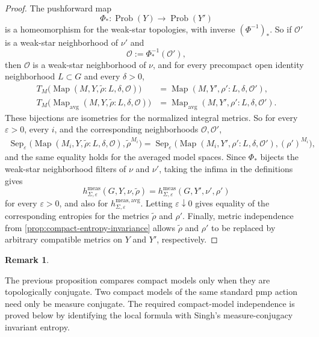 \documentclass[12pt]{amsart}
\theoremstyle{definition}
\newtheorem{remark}[remark]{Remark}
\newcommand{\Map}{\operatorname{Map}}
\newcommand{\Mapavg}{\operatorname{Map}_{\mathrm{avg}}}
\newcommand{\Sep}{\operatorname{Sep}}
\newcommand{\cO}{\mathcal O}
\newcommand{\1}{\mathbf 1}
\newcommand{\eps}{\varepsilon}
\begin{document}
\begin{proof}
	The pushforward map
	\[
	\Phi_*:\operatorname{Prob}(Y)\longrightarrow\operatorname{Prob}(Y')
	\]
	is a homeomorphism for the weak-star topologies, with inverse $(\Phi^{-1})_*$. So if $\cO'$ is a weak-star neighborhood of $\nu'$ and
	\[
	\cO:=\Phi_*^{-1}(\cO'),
	\]
	then $\cO$ is a weak-star neighborhood of $\nu$, and for every precompact open identity neighborhood $L\subset G$ and every $\delta>0$,
	\begin{align*}
		T_M\bigl(\Map(M,Y,\widetilde\rho:L,\delta,\cO)\bigr)
		&=\Map(M,Y',\rho':L,\delta,\cO'),\\
		T_M\bigl(\Mapavg(M,Y,\widetilde\rho:L,\delta,\cO)\bigr)
		&=\Mapavg(M,Y',\rho':L,\delta,\cO').
	\end{align*}
	These bijections are isometries for the normalized integral metrics. So for every $\eps>0$, every $i$, and the corresponding neighborhoods $\cO,\cO'$,
	\begin{align*}
		\Sep_\eps\bigl(\Map(M_i,Y,\widetilde\rho:L,\delta,\cO),
		\widetilde\rho^{M_i}\bigr)=
		\Sep_\eps\bigl(\Map(M_i,Y',\rho':L,\delta,\cO'),
		(\rho')^{M_i}\bigr),
	\end{align*}
	and the same equality holds for the averaged model spaces. Since $\Phi_*$ bijects the weak-star neighborhood filters of $\nu$ and $\nu'$, taking the infima in the definitions gives
	\[
	h^{\mathrm{meas}}_{\Sigma,\eps}(G,Y,\nu,\widetilde\rho)
	=h^{\mathrm{meas}}_{\Sigma,\eps}(G,Y',\nu',\rho')
	\]
	for every $\eps>0$, and also for $h^{\mathrm{meas,avg}}_{\Sigma,\eps}$. Letting $\eps\downarrow0$ gives equality of the corresponding entropies for the metrics $\widetilde\rho$ and $\rho'$. Finally, metric independence from \cref{prop:compact-entropy-invariance} allows $\widetilde\rho$ and $\rho'$ to be replaced by arbitrary compatible metrics on $Y$ and $Y'$, respectively.
\end{proof}
	\begin{remark}\label{rem:top-vs-measure-conjugacy}

		The previous proposition compares compact models only when they are
		topologically conjugate. Two compact models of the same standard pmp action
		need only be measure conjugate. The required compact-model independence is
		proved below by identifying the local formula with Singh's
		measure-conjugacy invariant entropy.

\end{remark}
\end{document}
